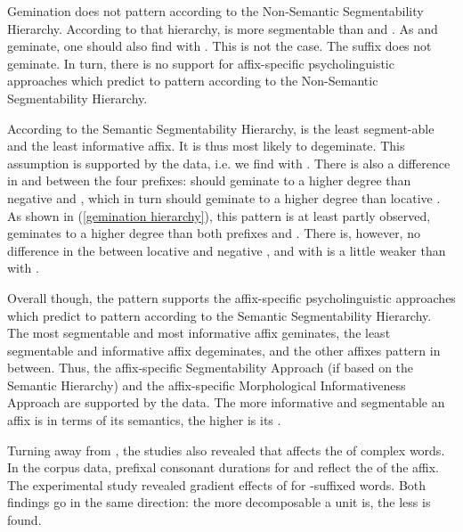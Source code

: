 Gemination does not pattern according to the Non-Semantic Segmentability Hierarchy. According to that hierarchy,  is more segmentable than  and . As  and  geminate, one should also find  with . This is not the case. The suffix  does not geminate.  In turn, there is no support for affix-specific psycholinguistic approaches which predict  to pattern according to the Non-Semantic Segmentability Hierarchy.


According to the Semantic Segmentability Hierarchy,  is the least segment-able and the least informative affix. It is thus most likely to degeminate. This assumption is supported by the data, i.e. we find  with . There is also a difference in  and  between the four prefixes:  should geminate to a higher degree than negative  and , which in turn should geminate to a higher degree than locative . As shown in (\ref{gemination hierarchy}), this pattern is at least partly observed,  geminates to a higher degree than both prefixes and . There is, however, no difference in the  between locative  and negative , and  with  is a little weaker than  with . 


Overall though, the  pattern supports the affix-specific psycholinguistic approaches which predict  to pattern according to the Semantic Segmentability Hierarchy. The most segmentable and most informative affix  geminates, the least segmentable and informative affix  degeminates, and the other affixes pattern in between.
Thus, the affix-specific Segmentability Approach (if based on the Semantic Hierarchy) and the affix-specific Morphological Informativeness Approach are supported by the data. The more informative and segmentable an affix is in terms of its semantics, the higher is its .


Turning away from , the studies also revealed that  affects the  of complex words.
 In the corpus data, prefixal consonant durations for  and  reflect the  of the affix. 
The experimental study revealed gradient effects of  for -suffixed words. 
Both findings go in the same direction: the more decomposable a unit is, the less  is found. 

